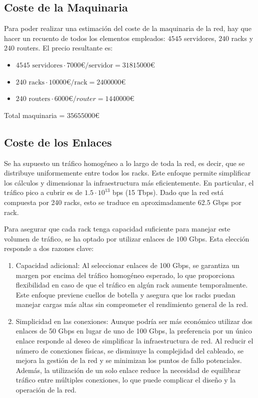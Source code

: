 \documentclass[%
    school=etsisi,%
    degree=61TI,%
]{upm-report}
\begin{document}
\subsection{Coste de la Maquinaria}
\label{subsec:coste-maquinaria}

Para poder realizar una estimación del coste de la maquinaria de la red, hay que hacer un recuento de todos los elementos empleados: $4545$ servidores, $240$ racks y $240$ routers. El precio resultante es:

\begin{itemize}
    \item $4545 \text{ servidores} \cdot 7000 €/\text{servidor} = 31815000 €$
    \item $240 \text{ racks} \cdot 10000 €/\text{rack} = 2400000 €$
    \item $240 \text{ routers} \cdot 6000 €/router = 1440000 €$
\end{itemize}

Total maquinaria = $35655000 €$

\subsection{Coste de los Enlaces}
\label{subsec:coste-enlaces}

Se ha supuesto un tráfico homogéneo a lo largo de toda la red, es decir, que se distribuye uniformemente entre todos los racks. Este enfoque permite simplificar los cálculos y dimensionar la infraestructura más eficientemente. En particular, el tráfico pico a cubrir es de $1.5 \cdot 10^{13}$ bps (15 Tbps). Dado que la red está compuesta por 240 racks, esto se traduce en aproximadamente 62.5 Gbps por rack.

Para asegurar que cada rack tenga capacidad suficiente para manejar este volumen de tráfico, se ha optado por utilizar enlaces de $100$ Gbps. Esta elección responde a dos razones clave:

\begin{enumerate}
    \item Capacidad adicional: Al seleccionar enlaces de 100 Gbps, se garantiza un margen por encima del tráfico homogéneo esperado, lo que proporciona flexibilidad en caso de que el tráfico en algún rack aumente temporalmente. Este enfoque previene cuellos de botella y asegura que los racks puedan manejar cargas más altas sin comprometer el rendimiento general de la red.
    \item Simplicidad en las conexiones: Aunque podría ser más económico utilizar dos enlaces de 50 Gbps en lugar de uno de 100 Gbps, la preferencia por un único enlace responde al deseo de simplificar la infraestructura de red. Al reducir el número de conexiones físicas, se disminuye la complejidad del cableado, se mejora la gestión de la red y se minimizan los puntos de fallo potenciales. Además, la utilización de un solo enlace reduce la necesidad de equilibrar tráfico entre múltiples conexiones, lo que puede complicar el diseño y la operación de la red.
\end{enumerate}
\end{document}

